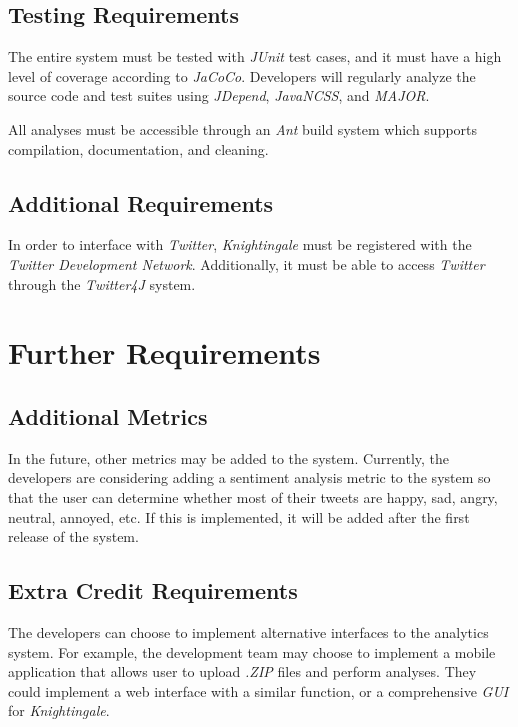 \documentclass[a4paper, 12pt]{article}
\begin{document}
\subsection{Testing Requirements} \label{sec:testing}
\begin{adjustwidth}{2em}{0pt}
The entire system must be tested with \textit{JUnit} test cases, and it must have a high level of coverage according to \textit{JaCoCo}. Developers will regularly analyze the source code and test suites using \textit{JDepend}, \textit{JavaNCSS}, and \textit{MAJOR}. \newline 

\noindent All analyses must be accessible through an \textit{Ant} build system which supports compilation, documentation, and cleaning.
\end{adjustwidth}

\subsection{Additional Requirements} \label{sec:additional}
\begin{adjustwidth}{2em}{0pt}
In order to interface with \textit{Twitter}, \textit{Knightingale} must be registered with the \textit{Twitter Development Network}. Additionally, it must be able to access \textit{Twitter} through the \textit{Twitter4J} system.
\end{adjustwidth}

\section{Further Requirements} \label{sec:further}
\subsection{Additional Metrics} \label{sec:metrics}
\begin{adjustwidth}{2em}{0pt}
In the future, other metrics may be added to the system. Currently, the developers are considering adding a sentiment analysis metric to the system so that the user can determine whether most of their tweets are happy, sad, angry, neutral, annoyed, etc. If this is implemented, it will be added after the first release of the system.
\end{adjustwidth}

\subsection{Extra Credit Requirements} \label{sec:extracredit}
\begin{adjustwidth}{2em}{0pt}
The developers can choose to implement alternative interfaces to the analytics system. For example, the development team may choose to implement a mobile application that allows user to upload \textit{.ZIP} files and perform analyses. They could implement a web interface with a similar function, or a comprehensive \textit{GUI} for \textit{Knightingale}. 
\end{adjustwidth}
\end{document}
